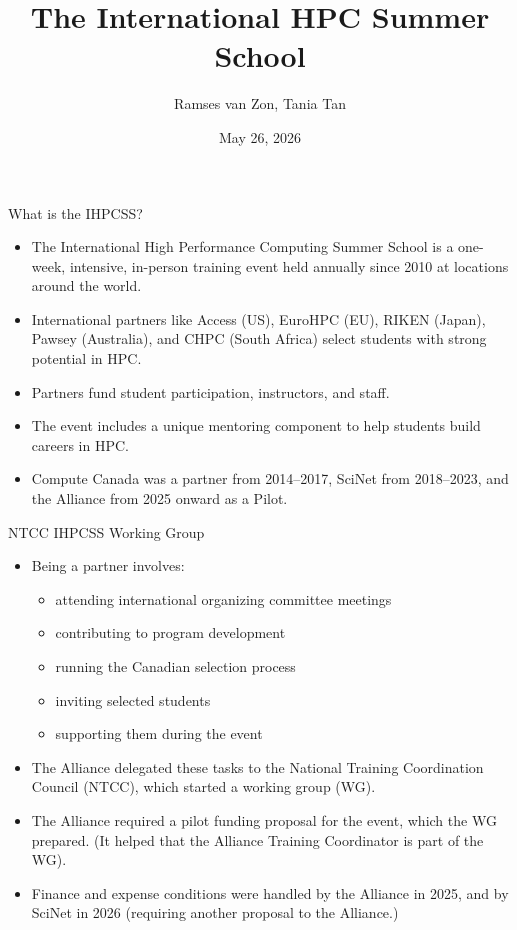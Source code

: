 \documentclass[
  11pt,
  ignorenonframetext,
  aspectratio=169,handout]{beamer}
\title{The International HPC Summer School}
\author{Ramses van Zon, Tania Tan}
\date{May 26, 2026}
\providecommand{\tightlist}{%
  \setlength{\itemsep}{0pt}\setlength{\parskip}{0pt}}
\begin{document}
\frame[plain]{\titlepage}

\begin{frame}{What is the IHPCSS?}
\label{what-is-the-ihpcss}
\pause

\begin{itemize}
\item
  The International High Performance Computing Summer School is a one-week, intensive, in-person training event held annually since 2010 at locations around the world.

  \pause
\item
  International partners like Access (US), EuroHPC (EU), RIKEN (Japan), Pawsey (Australia), and CHPC (South Africa) select students with strong potential in HPC.

  \pause
\item
  Partners fund student participation, instructors, and staff.

  \pause
\item
  The event includes a unique mentoring component to help students build careers in HPC.

  \pause
\item
  Compute Canada was a partner from 2014--2017, SciNet from 2018--2023, and the Alliance from 2025 onward as a Pilot.
\end{itemize}
\end{frame}

\begin{frame}{NTCC IHPCSS Working Group}
\label{ntcc-ihpcss-working-group}
\pause

\vspace{-3mm}

\begin{itemize}
\item
  Being a partner involves:

  \begin{itemize}
  \tightlist
  \item
    attending international organizing committee meetings
  \item
    contributing to program development
  \item
    running the Canadian selection process
  \item
    inviting selected students
  \item
    supporting them during the event
  \end{itemize}

  \pause
\item
  The Alliance delegated these tasks to the National Training Coordination Council (NTCC), which started a working group (WG).

  \pause
\item
  The Alliance required a pilot funding proposal for the event, which the WG prepared. (It helped that the Alliance Training Coordinator is part of the WG).

  \pause
\item
  Finance and expense conditions were handled by the Alliance in 2025, and by SciNet in 2026 (requiring another proposal to the Alliance.)
\end{itemize}
\end{frame}
\end{document}
